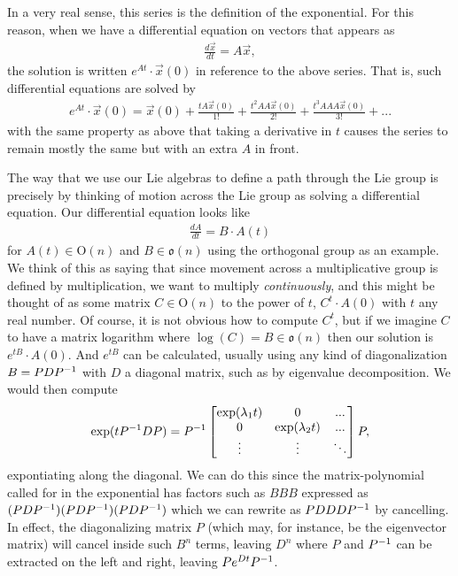 \documentclass[11pt]{article}
\begin{document}
In a very real sense, this series is the definition of the exponential. For this reason, when we have a differential equation on vectors that appears as \begin{gather*}
\frac{d\vec{x}}{dt} = A \vec{x},
\end{gather*}
the solution is written $e^{At}\cdot \vec{x}(0)$ in reference to the above series. That is, such differential equations are solved by \begin{gather*}
e^{At} \cdot \vec{x}(0) = \vec{x}(0) + \frac{tA\vec{x}(0)}{1!} + \frac{t^2 AA \vec{x}(0)}{2!} + \frac{t^3 AAA \vec{x}(0)}{3!} + ...
\end{gather*}
with the same property as above that taking a derivative in $t$ causes the series to remain mostly the same but with an extra $A$ in front.

The way that we use our Lie algebras to define a path through the Lie group is precisely by thinking of motion across the Lie group as solving a differential equation. Our differential equation looks like \begin{gather*}
\frac{dA}{dt} = B\cdot A(t)
\end{gather*}
for $A(t) \in \mathrm{O}(n)$ and $B \in \mathfrak{o}(n)$ using the orthogonal group as an example. We think of this as saying that since movement across a multiplicative group is defined by multiplication, we want to multiply \emph{continuously}, and this might be thought of as some matrix $C\in \mathrm{O}(n)$ to the power of $t$, $C^t \cdot A(0)$ with $t$ any real number. Of course, it is not obvious how to compute $C^t$, but if we imagine $C$ to have a matrix logarithm where $\log(C) = B \in \mathfrak{o}(n)$ then our solution is $e^{tB}\cdot A(0)$. And $e^{tB}$ can be calculated, usually using any kind of diagonalization $B = P D P^{-1}$ with $D$ a diagonal matrix, such as by eigenvalue decomposition. We would then compute \begin{gather*}
\exp(t P^{-1} D P) = P^{-1} \begin{bmatrix}
\exp(\lambda_1 t) & 0 & ... \\
0 & \exp(\lambda_2 t) & ... \\
\vdots & \vdots & \ddots
\end{bmatrix} P,
\end{gather*}
expontiating along the diagonal. We can do this since the matrix-polynomial called for in the exponential has factors such as $BBB$ expressed as $(P D P^{-1})(P D P^{-1})(P D P^{-1})$ which we can rewrite as $P DDD P^{-1}$ by cancelling. In effect, the diagonalizing matrix $P$ (which may, for instance, be the eigenvector matrix) will cancel inside such $B^n$ terms, leaving $D^n$ where $P$ and $P^{-1}$ can be extracted on the left and right, leaving $P e^{Dt} P^{-1}$.
\end{document}
